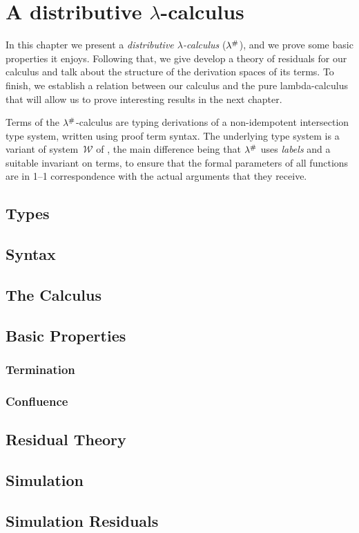 \chapter{A distributive $\lambda$-calculus}

In this chapter we present a
{\em distributive $\lambda$-calculus} ($\lambda^{\mathtt{\#}}$),
and we prove some basic properties it enjoys.
Following that, we give develop a theory of residuals for our calculus and talk
about the structure of the derivation spaces of its terms.
To finish, we establish a relation between our calculus and the pure lambda-calculus
that will allow us to prove interesting results in the next chapter.

Terms of the $\lambda^{\mathtt{\#}}$-calculus are typing derivations of a non-idempotent intersection type
system, written using proof term syntax.
The underlying type system is a variant of
system~$\mathcal{W}$ of \cite{bucciarelli2014inhabitation,bucciarelli2017non},
the main difference being that $\lambda^{\mathtt{\#}}$
uses {\em labels} and a suitable invariant on terms,
to ensure that the formal parameters of all functions
are in 1--1 correspondence with the actual arguments that they receive.

\section{Types}


\section{Syntax}


\section{The Calculus}


\section{Basic Properties}


\subsection{Termination}


\subsection{Confluence}


\section{Residual Theory}

\section{Simulation}

\section{Simulation Residuals}

